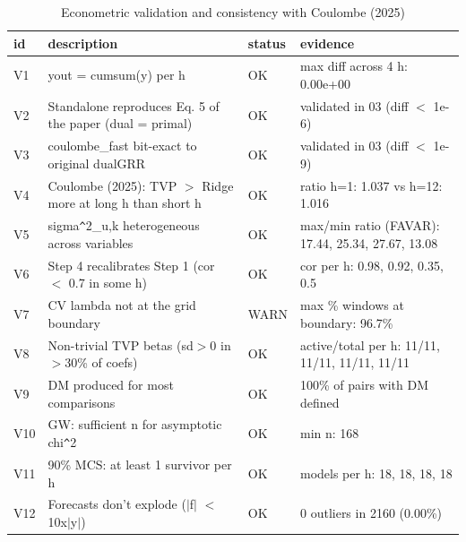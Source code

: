 \begin{table}[ht]
\centering
\begin{tabular}{llll}
  \hline
id & description & status & evidence \\ 
  \hline
V1 & yout = cumsum(y) per h & OK & max diff across 4 h: 0.00e+00 \\ 
  V2 & Standalone reproduces Eq. 5 of the paper (dual = primal) & OK & validated in 03 (diff $<$ 1e-6) \\ 
  V3 & coulombe\_fast bit-exact to original dualGRR & OK & validated in 03 (diff $<$ 1e-9) \\ 
  V4 & Coulombe (2025): TVP $>$ Ridge more at long h than short h & OK & ratio h=1: 1.037 vs h=12: 1.016 \\ 
  V5 & sigma\verb|^|2\_u,k heterogeneous across variables & OK & max/min ratio (FAVAR): 17.44, 25.34, 27.67, 13.08 \\ 
  V6 & Step 4 recalibrates Step 1 (cor $<$ 0.7 in some h) & OK & cor per h: 0.98, 0.92, 0.35, 0.5 \\ 
  V7 & CV lambda not at the grid boundary & WARN & max \% windows at boundary: 96.7\% \\ 
  V8 & Non-trivial TVP betas (sd$>$0 in $>$30\% of coefs) & OK & active/total per h: 11/11, 11/11, 11/11, 11/11 \\ 
  V9 & DM produced for most comparisons & OK & 100\% of pairs with DM defined \\ 
  V10 & GW: sufficient n for asymptotic chi\verb|^|2 & OK & min n: 168 \\ 
  V11 & 90\% MCS: at least 1 survivor per h & OK & models per h: 18, 18, 18, 18 \\ 
  V12 & Forecasts don't explode ($|$f$|$ $<$ 10x$|$y$|$) & OK & 0 outliers in 2160 (0.00\%) \\ 
   \hline
\end{tabular}
\caption{Econometric validation and consistency with Coulombe (2025)} 
\label{tab:validation}
\end{table}
